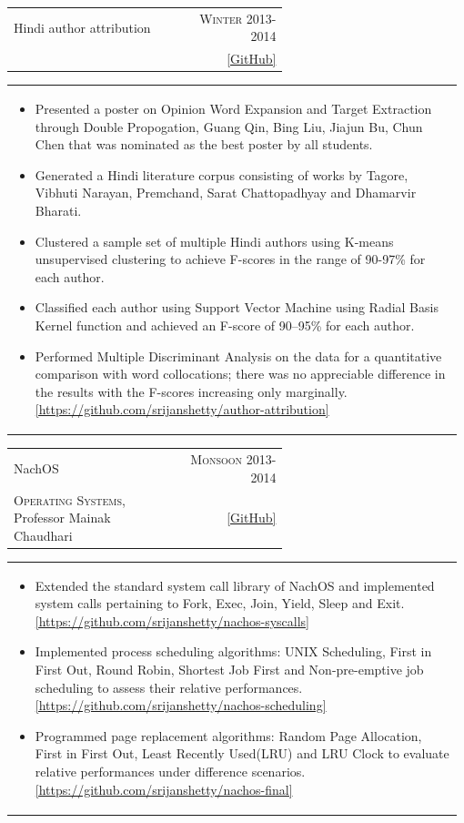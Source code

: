 \documentclass[a4paper]{article} %
\newcommand{\verticalspacing}{-0.25cm}
\newcommand{\bulletspace}{0.7cm}
\newcommand{\cproject}[5]{
    \begin{tabular}{p{0.60\linewidth}r}
        \textcolor{NavyBlue}{\small #2} & \multicolumn{1}{m{7.3cm}}{\raggedleft \small {\textsc{#1}}}\\
        \small {#3} & \small {#4}
    \end{tabular}
    \begin{tabular}{p{0.98\linewidth}}
    \vspace{-0.3cm}
        \small{#5}
    \end{tabular}
    \vspace{\verticalspacing{}}
}
\begin{document}
\cproject
    {Winter 2013-2014}
    {Hindi author attribution}
    {\textsc{\raggedright Artificial Intelligence}, Professor Amitabha Mukherjee}
    { \href{https://github.com/srijanshetty/author-attribution} {[GitHub]} }
    {
        \begin{itemize}[leftmargin=\bulletspace{}]
            \item Presented a poster on Opinion Word Expansion and Target Extraction through Double Propogation, Guang Qin,
                Bing Liu, Jiajun Bu, Chun Chen that was nominated as the best poster by all students.
            \item Generated a Hindi literature corpus consisting of works by Tagore,
                Vibhuti Narayan, Premchand, Sarat Chattopadhyay and Dhamarvir Bharati.
            \item Clustered a sample set of multiple Hindi authors using K-means unsupervised clustering to achieve
                F-scores in the range of 90-97\% for each author.
            \item Classified each author using Support Vector Machine using Radial Basis Kernel function
                and achieved an F-score of 90--95\% for each author.
            \item Performed Multiple Discriminant Analysis on the data for a quantitative comparison with word
                collocations; there was no appreciable difference in the results with the F-scores increasing only
                marginally.
                \href{https://github.com/srijanshetty/author-attribution} {[https://github.com/srijanshetty/author-attribution]}
        \end{itemize}
    }

\cproject
    {Monsoon 2013-2014}
    {NachOS}
    {\textsc{Operating Systems}, Professor Mainak Chaudhari}
    {\href{https://github.com/srijanshetty/} {[GitHub]} }
    {
        \begin{itemize}[leftmargin=\bulletspace{}]
            \item Extended the standard system call library of NachOS and implemented system calls pertaining to Fork, Exec,
                Join, Yield, Sleep and Exit.
                \href{https://github.com/srijanshetty/nachos-syscalls/}{[https://github.com/srijanshetty/nachos-syscalls]}
            \item Implemented process scheduling algorithms: UNIX Scheduling, First in First Out,
                Round Robin, Shortest Job First and Non-pre-emptive job scheduling to assess their relative performances.
                \href{https://github.com/srijanshetty/nachos-scheduling}{[https://github.com/srijanshetty/nachos-scheduling]}
            \item Programmed page replacement algorithms: Random Page Allocation, First in First Out,
                Least Recently Used(LRU) and LRU Clock to evaluate relative performances under difference scenarios.
                \href{https://github.com/srijanshetty/nachos-final}{[https://github.com/srijanshetty/nachos-final]}
        \end{itemize}
    }
\end{document}
